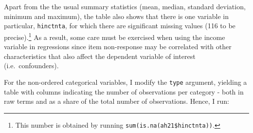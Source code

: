 \documentclass[
]{article}
\begin{document}
\begin{table}[!h]

\caption{\label{tab:eda-ah21}Summary statistics for ordered catgeorical variables}
\centering
{}
\end{table}

Apart from the the usual summary statistics (mean, median, standard
deviation, minimum and maximum), the table also shows that there is one
variable in particular, \texttt{hinctnta}, for which there are
significant missing values (116 to be precise).\footnote{This number is
  obtained by running \texttt{sum(is.na(ah21\$hinctnta))}.} As a result,
some care must be exercised when using the income variable in
regressions since item non-response may be correlated with other
characteristics that also affect the dependent variable of interest
(i.e.~confounders).

For the non-ordered categorical variables, I modify the \texttt{type}
argument, yielding a table with columns indicating the number of
observations per category - both in raw terms and as a share of the
total number of observations. Hence, I run:
\end{document}
